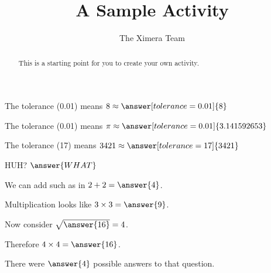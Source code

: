 \documentclass{ximera}
\title{A Sample Activity}
\author{The Ximera Team}
\begin{document}
\begin{abstract}
This is a starting point for you to create your own activity.
\end{abstract}

\maketitle

\begin{problem}
   The tolerance (0.01) means $8 \approx \answer[tolerance=0.01]{8}$
\end{problem}

 \begin{problem}
   The tolerance (0.01) means $\pi \approx \answer[tolerance=0.01]{3.141592653}$
 \end{problem}

 \begin{problem}
   The tolerance (17) means $3421 \approx \answer[tolerance=17]{3421}$
 \end{problem}
\begin{problem}
HUH? $\answer{WHAT}$
\end{problem}

 \begin{problem}
   We can add such as in $2 + 2 = \answer{4}$.
   \begin{problem}
     Multiplication looks like $3 \times 3 = \answer{9}$.
     \begin{problem}
       Now consider $\sqrt{\answer{16}} = 4$.
       \begin{problem}
         Therefore $4 \times 4 = \answer{16}$.
       \end{problem}
     \end{problem}
   \end{problem}
   \end{problem}

\begin{problem}
  \begin{multipleChoice}
   \end{multipleChoice}

   \begin{problem}
     There were $\answer{4}$ possible answers to that question.

     \begin{problem}
       \begin{multipleChoice}
       \end{multipleChoice}
     \end{problem}
   \end{problem}
\end{problem}
\end{document}
